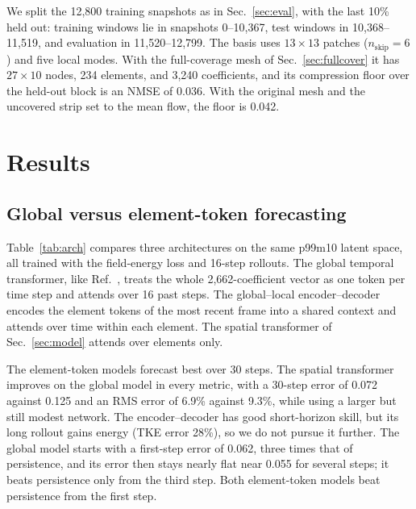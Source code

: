 \documentclass[conf]{new-aiaa}
\begin{document}
We split the 12,800 training snapshots as in Sec.~\ref{sec:eval}, with the last 10\% held out: training windows lie in snapshots 0--10,367, test windows in 10,368--11,519, and evaluation in 11,520--12,799. The basis uses $13\times13$ patches ($n_\mathrm{skip}=6$) and five local modes. With the full-coverage mesh of Sec.~\ref{sec:fullcover} it has $27\times10$ nodes, 234 elements, and 3,240 coefficients, and its compression floor over the held-out block is an NMSE of 0.036. With the original mesh and the uncovered strip set to the mean flow, the floor is 0.042.

\section{Results}
\label{sec:results}

\subsection{Global versus element-token forecasting}
\label{sec:res_arch}
Table~\ref{tab:arch} compares three architectures on the same p99m10 latent space, all trained with the field-energy loss and 16-step rollouts. The global temporal transformer, like Ref.~\cite{morton2026scitech}, treats the whole 2,662-coefficient vector as one token per time step and attends over 16 past steps. The global--local encoder--decoder encodes the element tokens of the most recent frame into a shared context and attends over time within each element. The spatial transformer of Sec.~\ref{sec:model} attends over elements only.

The element-token models forecast best over 30 steps. The spatial transformer improves on the global model in every metric, with a 30-step error of 0.072 against 0.125 and an RMS error of 6.9\% against 9.3\%, while using a larger but still modest network. The encoder--decoder has good short-horizon skill, but its long rollout gains energy (TKE error 28\%), so we do not pursue it further. The global model starts with a first-step error of 0.062, three times that of persistence, and its error then stays nearly flat near 0.055 for several steps; it beats persistence only from the third step. Both element-token models beat persistence from the first step.
\end{document}
